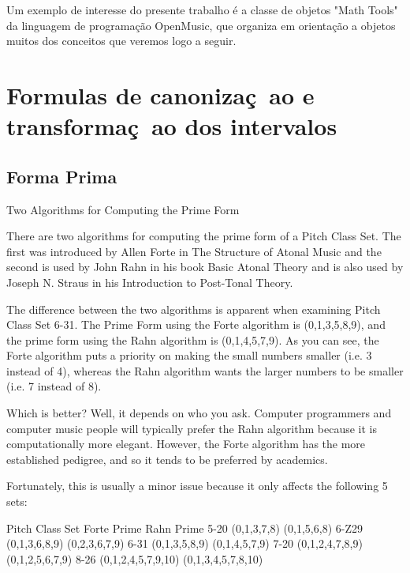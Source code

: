 \documentclass[
	12pt,				%
	openright,			%
	twoside,			%
	a4paper,			%
	english,			%
	french,				%
	spanish,			%
	brazil				%
	]{abntex2}
\begin{document}
Um exemplo de interesse do presente trabalho é a classe de objetos "Math Tools"\cite{andreatta2003implementing,AndreataOMtutorial,DebrilOM} da linguagem de programação OpenMusic, que organiza em orientação a objetos muitos dos conceitos que veremos logo a seguir. 








\section{Formulas de canonizaç~ao e transformaç~ao dos intervalos}










\subsection{Forma Prima}

\begin{citacao}
Two Algorithms for Computing the Prime Form

There are two algorithms for computing the prime form of a Pitch Class Set. The first was introduced by Allen Forte in The Structure of Atonal Music and the second is used by John Rahn in his book Basic Atonal Theory and is also used by Joseph N. Straus in his Introduction to Post-Tonal Theory.

The difference between the two algorithms is apparent when examining Pitch Class Set 6-31. The Prime Form using the Forte algorithm is (0,1,3,5,8,9), and the prime form using the Rahn algorithm is (0,1,4,5,7,9). As you can see, the Forte algorithm puts a priority on making the small numbers smaller (i.e. 3 instead of 4), whereas the Rahn algorithm wants the larger numbers to be smaller (i.e. 7 instead of 8).

Which is better? Well, it depends on who you ask. Computer programmers and computer music people will typically prefer the Rahn algorithm because it is computationally more elegant. However, the Forte algorithm has the more established pedigree, and so it tends to be preferred by academics.

Fortunately, this is usually a minor issue because it only affects the following 5 sets:

Pitch Class Set	Forte Prime	Rahn Prime
5-20	(0,1,3,7,8)	(0,1,5,6,8)
6-Z29	(0,1,3,6,8,9)	(0,2,3,6,7,9)
6-31	(0,1,3,5,8,9)	(0,1,4,5,7,9)
7-20	(0,1,2,4,7,8,9)	(0,1,2,5,6,7,9)
8-26	(0,1,2,4,5,7,9,10)	(0,1,3,4,5,7,8,10)
\end{citacao}
\end{document}
